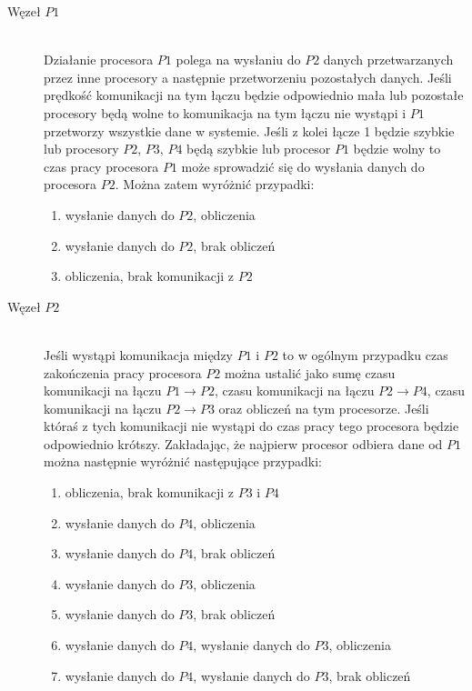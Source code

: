 \begin{description}

\item[Węzeł $P1$] \hfill \\

Działanie procesora $P1$ polega na wysłaniu do $P2$ danych przetwarzanych przez inne procesory a następnie przetworzeniu pozostałych danych.
Jeśli prędkość komunikacji na tym łączu będzie odpowiednio mała lub pozostałe procesory będą wolne to komunikacja na tym łączu nie wystąpi
i $P1$ przetworzy wszystkie dane w systemie. Jeśli z kolei łącze 1 będzie szybkie lub procesory $P2$, $P3$, $P4$ będą szybkie
lub procesor $P1$ będzie wolny to czas pracy procesora $P1$ może sprowadzić się do wysłania danych do procesora $P2$.
Można zatem wyróżnić przypadki:

\begin{enumerate}
\item wysłanie danych do $P2$, obliczenia
\item wysłanie danych do $P2$, brak obliczeń
\item obliczenia, brak komunikacji z $P2$
\end{enumerate}

\item[Węzeł $P2$] \hfill \\

Jeśli wystąpi komunikacja między $P1$ i $P2$ to w ogólnym przypadku czas zakończenia pracy procesora $P2$ można ustalić jako sumę czasu komunikacji na łączu $P1 \to P2$,
czasu komunikacji na łączu $P2 \to P4$, czasu komunikacji na łączu $P2 \to P3$ oraz obliczeń na tym procesorze.
Jeśli któraś z tych komunikacji nie wystąpi do czas pracy tego procesora będzie odpowiednio krótszy.
Zakładając, że najpierw procesor odbiera dane od $P1$ można następnie wyróżnić następujące przypadki:

\begin{enumerate}
\item obliczenia, brak komunikacji z $P3$ i $P4$
\item wysłanie danych do $P4$, obliczenia
\item wysłanie danych do $P4$, brak obliczeń
\item wysłanie danych do $P3$, obliczenia
\item wysłanie danych do $P3$, brak obliczeń
\item wysłanie danych do $P4$, wysłanie danych do $P3$, obliczenia
\item wysłanie danych do $P4$, wysłanie danych do $P3$, brak obliczeń
\end{enumerate}


\end{description}
